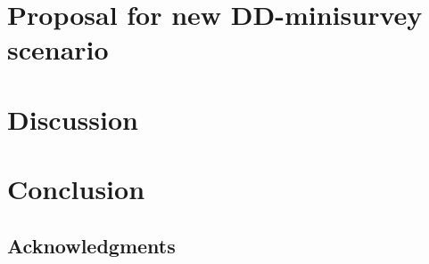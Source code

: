 \documentclass[\docopts]{\docclass}
\begin{document}
\section{Proposal for new DD-minisurvey scenario}
\label{sec:proposal}


\section{Discussion}
\label{sec:discussion}




\section{Conclusion}
\label{sec:conclusion}




\subsection*{Acknowledgments}











\end{document}
